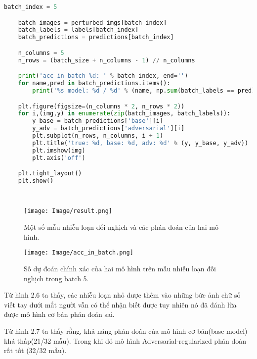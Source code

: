 \begin{lstlisting}[language = Python]
    batch_index = 5

    batch_images = perturbed_imgs[batch_index]
    batch_labels = labels[batch_index]
    batch_predictions = predictions[batch_index]

    n_columns = 5
    n_rows = (batch_size + n_columns - 1) // n_columns

    print('acc in batch %d: ' % batch_index, end='')
    for name,pred in batch_predictions.items():
        print('%s model: %d / %d' % (name, np.sum(batch_labels == pred), batch_size))

    plt.figure(figsize=(n_columns * 2, n_rows * 2))
    for i,(img,y) in enumerate(zip(batch_images, batch_labels)):
        y_base = batch_predictions['base'][i]
        y_adv = batch_predictions['adversarial'][i]
        plt.subplot(n_rows, n_columns, i + 1)
        plt.title('true: %d, base: %d, adv: %d' % (y, y_base, y_adv))
        plt.imshow(img)
        plt.axis('off')

    plt.tight_layout()
    plt.show()

    
\end{lstlisting}

\begin{figure}[h!]
    \centering
    \texttt{[image: Image/result.png]}
    \caption{Một số mẫu nhiễu loạn đối nghịch và các phán đoán của hai mô hình.}
    \label{fig 2.6:Một số mẫu nhiễu loạn đối nghịch và các phán đoán của hai mô hình.}
    
\end{figure}

\begin{figure}[h!]
    \centering
    \texttt{[image: Image/acc\_in\_batch.png]}
    \caption{Số dự đoán chính xác của hai mô hình trên mẫu nhiễu loạn đối nghịch trong batch 5.}
    \label{fig 2.7:Số dự đoán chính xác của hai mô hình trên mẫu nhiễu loạn đối nghịch trong batch 5.}
    
\end{figure}

Từ hình 2.6 ta thấy, các nhiễu loạn nhỏ được thêm vào những bức ảnh chữ số viết tay dưới mắt người vẫn có thể nhận biết được
tuy nhiên nó đã đánh lừa được mô hình cơ bản phán đoán sai.

Từ hình 2.7 ta thấy rằng, khả năng phán đoán của mô hình cơ bản(base model) khá thấp(21/32 mẫu). Trong khi đó
mô hình Adversarial-regularized phán đoán rất tốt (32/32 mẫu).


